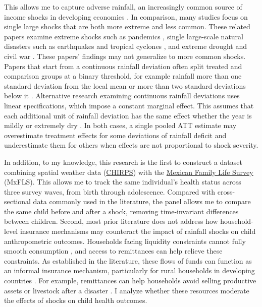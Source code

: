 \documentclass[12pt]{article}
\begin{document}
This allows me to capture adverse rainfall, an increasingly common source of income shocks in developing economies \parencite{dinkelmanLongRunHealthRepercussions2017}. In comparison, many studies focus on single large shocks that are both more extreme and less common. These related papers examine extreme shocks such as pandemics \parencite{almond1918InfluenzaPandemic2006,kellyScourgeAsianFlu2011,beach1918InfluenzaPandemic2022}, single large-scale natural disasters such as earthquakes and tropical cyclones \parencite{carusoLongRunEffects2015,fujikiDisentanglingEffectsMultiple2015,deuchertTempestShortLongterm2015,dodlovaEffects2010Haiti2023}, and extreme drought and civil war \parencite{aldermanLongTermConsequences2006}. These papers' findings may not generalize to more common shocks. Papers that start from a continuous rainfall deviation often split treated and comparison groups at a binary threshold, for example rainfall more than one standard deviation from the local mean \parencite{skoufiasClimateVariabilityChild2012,adhvaryuHelpingChildrenCatch2024} or more than two standard deviations below it \parencite{hirvonenImpactEthiopias20152020,kudamatsuWeatherInfantMortality2012}. Alternative research examining continuous rainfall deviations uses linear specifications, which impose a constant marginal effect. This assumes that each additional unit of rainfall deviation has the same effect whether the year is mildly or extremely dry \parencite{macciniWeatherHealthSchooling2009,rochaWaterScarcityBirth2015}. In both cases, a single pooled ATT estimate may overestimate treatment effects for some deviations of rainfall deficit and underestimate them for others when effects are not proportional to shock severity.

In addition, to my knowledge, this research is the first to construct a dataset combining spatial weather data (\href{https://www.chc.ucsb.edu/data/chirps}{CHIRPS}) with the \href{https://ennvih-mxfls.org/english/index.html}{Mexican Family Life Survey} (MxFLS). This allows me to track the same individual's health status across three survey waves, from birth through adolescence. Compared with cross-sectional data commonly used in the literature, the panel allows me to compare the same child before and after a shock, removing time-invariant differences between children. Second, most prior literature does not address how household-level insurance mechanisms may counteract the impact of rainfall shocks on child anthropometric outcomes. Households facing liquidity constraints cannot fully smooth consumption \parencite{deatonSavingLiquidityConstraints1991}, and access to remittances can help relieve these constraints. As established in the literature, these flows of funds can function as an informal insurance mechanism, particularly for rural households in developing countries \parencite{yangMigrantRemittances2011}. For example, remittances can help households avoid selling productive assets or livestock after a disaster \parencite{mohapatraRemittancesNaturalDisasters2012}. I analyze whether these resources moderate the effects of shocks on child health outcomes.
\end{document}
